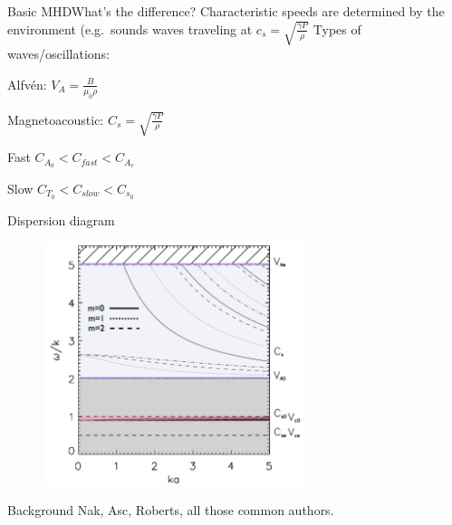 \documentclass[table]{beamer}
\begin{document}
\begin{frame}{Basic MHD}{What's the difference?}
    Characteristic speeds are determined by the environment
    (e.g.\ sounds waves traveling at $c_s=\sqrt{\frac{\gamma P}{\rho}}$
    Types of waves/oscillations:
    \begin{itemize*}
        \item Alfv\'en: $V_A = \frac{B}{\mu_0\rho}$
        \item Magnetoacoustic: $C_s = \sqrt{\frac{\gamma P}{\rho}}$
            \begin{itemize*}
                \item Fast $C_{A_0} < C_{fast} < C_{A_e} $
                \item Slow $C_{T_0} < C_{slow} < C_{s_0} $
            \end{itemize*}
    \end{itemize*}
\end{frame}%

\begin{frame}{Dispersion diagram}
    \begin{figure}
        \includegraphics[width=3in]{disp_diagram.png}
    \end{figure}
\end{frame}%

\begin{frame}{Background}
    Nak, Asc, Roberts, all those common authors.
\end{frame}%
\end{document}
